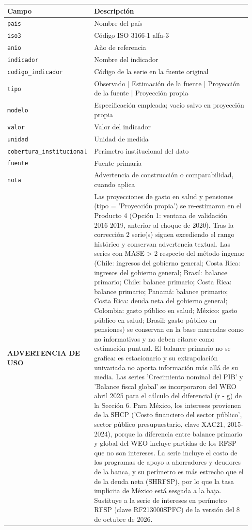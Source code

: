 \begin{tabular}{>{\raggedright\arraybackslash}p{4.3cm}>{\raggedright\arraybackslash}p{10.4cm}}
\toprule
Campo & Descripción \\
\midrule
\texttt{pais} & Nombre del país \\
\texttt{iso3} & Código ISO 3166-1 alfa-3 \\
\texttt{anio} & Año de referencia \\
\texttt{indicador} & Nombre del indicador \\
\texttt{codigo\_indicador} & Código de la serie en la fuente original \\
\texttt{tipo} & Observado | Estimación de la fuente | Proyección de la fuente | Proyección propia \\
\texttt{modelo} & Especificación empleada; vacío salvo en proyección propia \\
\texttt{valor} & Valor del indicador \\
\texttt{unidad} & Unidad de medida \\
\texttt{cobertura\_institucional} & Perímetro institucional del dato \\
\texttt{fuente} & Fuente primaria \\
\texttt{nota} & Advertencia de construcción o comparabilidad, cuando aplica \\
\midrule
\textbf{ADVERTENCIA DE USO} & \small Las proyecciones de gasto en salud y pensiones (tipo = 'Proyección propia') se re-estimaron en el Producto 4 (Opción 1: ventana de validación 2016-2019, anterior al choque de 2020). Tras la corrección 2 serie(s) siguen excediendo el rango histórico y conservan advertencia textual. Las series con MASE > 2 respecto del método ingenuo (Chile: ingresos del gobierno general; Costa Rica: ingresos del gobierno general; Brasil: balance primario; Chile: balance primario; Costa Rica: balance primario; Panamá: balance primario; Costa Rica: deuda neta del gobierno general; Colombia: gasto público en salud; México: gasto público en salud; Brasil: gasto público en pensiones) se conservan en la base marcadas como no informativas y no deben citarse como estimación puntual. El balance primario no se grafica: es estacionario y su extrapolación univariada no aporta información más allá de su media. Las series 'Crecimiento nominal del PIB' y 'Balance fiscal global' se incorporaron del WEO abril 2025 para el cálculo del diferencial (r - g) de la Sección 6. Para México, los intereses provienen de la SHCP ('Costo financiero del sector público', sector público presupuestario, clave XAC21, 2015-2024), porque la diferencia entre balance primario y global del WEO incluye partidas de los RFSP que no son intereses. La serie incluye el costo de los programas de apoyo a ahorradores y deudores de la banca, y su perímetro es más estrecho que el de la deuda neta (SHRFSP), por lo que la tasa implícita de México está sesgada a la baja. Sustituye a la serie de intereses en perímetro RFSP (clave RF213000SPFC) de la versión del 8 de octubre de 2026. \\
\bottomrule
\end{tabular}
